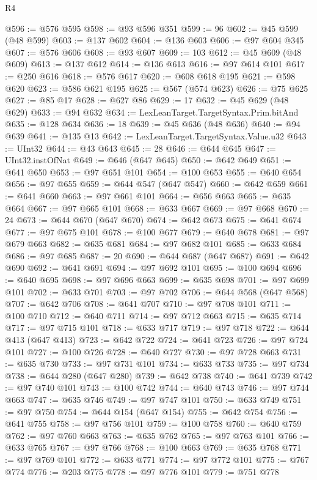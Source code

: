 \begin{lexlean}{R4}
\begin{coremodule}
@596 := @576 @595
@598 := @93 @596 @351
@599 := 96
@602 := @45 @599 (@48 @599)
@603 := @137 @602
@604 := @136 @603
@606 := @97 @604 @345
@607 := @576 @606
@608 := @93 @607
@609 := 103
@612 := @45 @609 (@48 @609)
@613 := @137 @612
@614 := @136 @613
@616 := @97 @614 @101
@617 := @250 @616
@618 := @576 @617
@620 := @608 @618 @195
@621 := @598 @620
@623 := @586 @621 @195
@625 := @567 (@574 @623)
@626 := @75 @625
@627 := @85 @17
@628 := @627 @86
@629 := 17
@632 := @45 @629 (@48 @629)
@633 := @94 @632
@634 := LexLeanTarget.TargetSyntax.Prim.bitAnd
@635 := @128 @634
@636 := 18
@639 := @45 @636 (@48 @636)
@640 := @94 @639
@641 := @135 @13
@642 := LexLeanTarget.TargetSyntax.Value.u32
@643 := UInt32
@644 := @43 @643
@645 := 28
@646 := @644 @645
@647 := UInt32.instOfNat
@649 := @646 (@647 @645)
@650 := @642 @649
@651 := @641 @650
@653 := @97 @651 @101
@654 := @100 @653
@655 := @640 @654
@656 := @97 @655
@659 := @644 @547 (@647 @547)
@660 := @642 @659
@661 := @641 @660
@663 := @97 @661 @101
@664 := @656 @663
@665 := @635 @664
@667 := @97 @665 @101
@668 := @633 @667
@669 := @97 @668
@670 := 24
@673 := @644 @670 (@647 @670)
@674 := @642 @673
@675 := @641 @674
@677 := @97 @675 @101
@678 := @100 @677
@679 := @640 @678
@681 := @97 @679 @663
@682 := @635 @681
@684 := @97 @682 @101
@685 := @633 @684
@686 := @97 @685
@687 := 20
@690 := @644 @687 (@647 @687)
@691 := @642 @690
@692 := @641 @691
@694 := @97 @692 @101
@695 := @100 @694
@696 := @640 @695
@698 := @97 @696 @663
@699 := @635 @698
@701 := @97 @699 @101
@702 := @633 @701
@703 := @97 @702
@706 := @644 @568 (@647 @568)
@707 := @642 @706
@708 := @641 @707
@710 := @97 @708 @101
@711 := @100 @710
@712 := @640 @711
@714 := @97 @712 @663
@715 := @635 @714
@717 := @97 @715 @101
@718 := @633 @717
@719 := @97 @718
@722 := @644 @413 (@647 @413)
@723 := @642 @722
@724 := @641 @723
@726 := @97 @724 @101
@727 := @100 @726
@728 := @640 @727
@730 := @97 @728 @663
@731 := @635 @730
@733 := @97 @731 @101
@734 := @633 @733
@735 := @97 @734
@738 := @644 @280 (@647 @280)
@739 := @642 @738
@740 := @641 @739
@742 := @97 @740 @101
@743 := @100 @742
@744 := @640 @743
@746 := @97 @744 @663
@747 := @635 @746
@749 := @97 @747 @101
@750 := @633 @749
@751 := @97 @750
@754 := @644 @154 (@647 @154)
@755 := @642 @754
@756 := @641 @755
@758 := @97 @756 @101
@759 := @100 @758
@760 := @640 @759
@762 := @97 @760 @663
@763 := @635 @762
@765 := @97 @763 @101
@766 := @633 @765
@767 := @97 @766
@768 := @100 @663
@769 := @635 @768
@771 := @97 @769 @101
@772 := @633 @771
@774 := @97 @772 @101
@775 := @767 @774
@776 := @203 @775
@778 := @97 @776 @101
@779 := @751 @778

\end{coremodule}
\end{lexlean}
